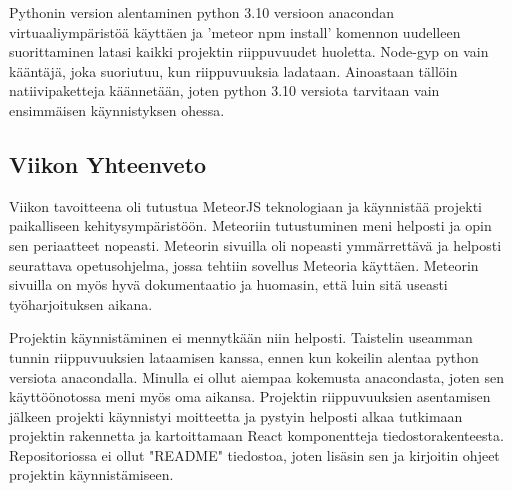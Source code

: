 Pythonin version alentaminen python 3.10 versioon anacondan virtuaaliympäristöä käyttäen ja 'meteor npm install' komennon uudelleen suorittaminen latasi kaikki projektin riippuvuudet huoletta.
Node-gyp on vain kääntäjä, joka suoriutuu, kun riippuvuuksia ladataan. Ainoastaan tällöin natiivipaketteja käännetään, joten python 3.10 versiota tarvitaan vain ensimmäisen käynnistyksen ohessa.
\medskip


\subsection*{Viikon Yhteenveto}
Viikon tavoitteena oli tutustua MeteorJS teknologiaan ja käynnistää projekti paikalliseen kehitysympäristöön.
Meteoriin tutustuminen meni helposti ja opin sen periaatteet nopeasti. Meteorin sivuilla oli nopeasti ymmärrettävä ja helposti seurattava opetusohjelma, jossa tehtiin sovellus Meteoria käyttäen.
Meteorin sivuilla on myös hyvä dokumentaatio ja huomasin, että luin sitä useasti työharjoituksen aikana. \medskip

Projektin käynnistäminen ei mennytkään niin helposti. Taistelin useamman tunnin riippuvuuksien lataamisen kanssa, ennen kun kokeilin alentaa python versiota anacondalla. Minulla ei ollut aiempaa kokemusta anacondasta, joten sen käyttöönotossa meni myös oma aikansa.
Projektin riippuvuuksien asentamisen jälkeen projekti käynnistyi moitteetta ja pystyin helposti alkaa tutkimaan projektin rakennetta ja kartoittamaan React komponentteja tiedostorakenteesta. Repositoriossa ei ollut "README"{} tiedostoa, joten lisäsin sen ja kirjoitin ohjeet projektin käynnistämiseen.

